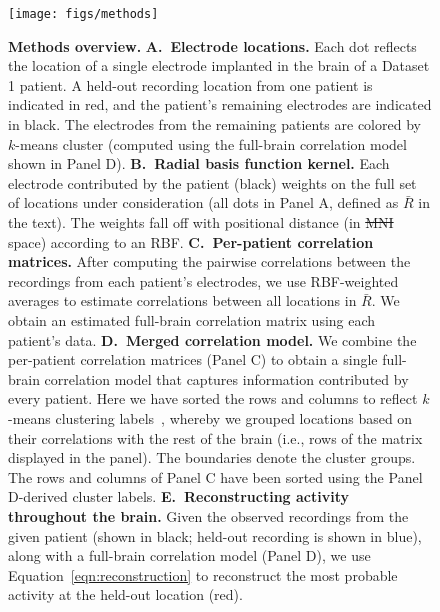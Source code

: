 \documentclass[10pt]{article}
\providecommand{\DIFaddtex}[1]{{\protect\color{blue}\uwave{#1}}} %
\providecommand{\DIFdeltex}[1]{{\protect\color{red}\sout{#1}}}                      %
\providecommand{\DIFaddFL}[1]{\DIFadd{#1}} %
\providecommand{\DIFdelFL}[1]{\DIFdel{#1}} %
\providecommand{\DIFaddbeginFL}{} %
\providecommand{\DIFaddendFL}{} %
\providecommand{\DIFdelbeginFL}{} %
\providecommand{\DIFdelendFL}{} %
\providecommand{\DIFadd}[1]{\texorpdfstring{\DIFaddtex{#1}}{#1}} %
\providecommand{\DIFdel}[1]{\texorpdfstring{\DIFdeltex{#1}}{}} %
\newcommand{\DIFscaledelfig}{0.5}
\newlength{\DIFdelgraphicswidth} %
\newlength{\DIFdelgraphicsheight} %
\newcommand{\DIFaddincludegraphics}[2][]{{\color{blue}\fbox{\DIFOincludegraphics[#1]{#2}}}} %
\newcommand{\DIFdelincludegraphics}[2][]{%
\sbox{\DIFdelgraphicsbox}{\DIFOincludegraphics[#1]{#2}}%
\settoboxwidth{\DIFdelgraphicswidth}{\DIFdelgraphicsbox} %
\settoboxtotalheight{\DIFdelgraphicsheight}{\DIFdelgraphicsbox} %
\scalebox{\DIFscaledelfig}{%
\parbox[b]{\DIFdelgraphicswidth}{\usebox{\DIFdelgraphicsbox}\\[-\baselineskip] \rule{\DIFdelgraphicswidth}{0em}}\llap{\resizebox{\DIFdelgraphicswidth}{\DIFdelgraphicsheight}{%
\setlength{\unitlength}{\DIFdelgraphicswidth}%
\begin{picture}(1,1)%
\thicklines\linethickness{2pt} %
{\color[rgb]{1,0,0}\put(0,0){\framebox(1,1){}}}%
{\color[rgb]{1,0,0}\put(0,0){\line( 1,1){1}}}%
{\color[rgb]{1,0,0}\put(0,1){\line(1,-1){1}}}%
\end{picture}%
}\hspace*{3pt}}} %
} %
\DeclareRobustCommand{\DIFaddbeginFL}{\DIFOaddbeginFL \let\includegraphics\DIFaddincludegraphics} %
\DeclareRobustCommand{\DIFaddendFL}{\DIFOaddendFL \let\includegraphics\DIFOincludegraphics} %
\DeclareRobustCommand{\DIFdelbeginFL}{\DIFOdelbeginFL \let\includegraphics\DIFdelincludegraphics} %
\DeclareRobustCommand{\DIFdelendFL}{\DIFOaddendFL \let\includegraphics\DIFOincludegraphics} %
\begin{document}
\begin{figure}
  \centering \texttt{[image: figs/methods]}
  \caption{\textbf{Methods overview.}  \textbf{A.~Electrode locations.}  Each
  dot reflects the location of a single electrode implanted in the brain of a
  Dataset 1 patient.  A held-out recording location from one patient is
  indicated in red, and the patient's remaining electrodes are indicated in
  black. The electrodes from the remaining patients are colored by $k$-means
  cluster (computed using the full-brain correlation model shown in Panel D).
  \textbf{B.~Radial basis function kernel.} Each electrode contributed by the
  patient (black) weights on the full set of locations under consideration (all
  dots in Panel A, defined as \DIFdelbeginFL \DIFdelFL{$\bar{R}$ }\DIFdelendFL \DIFaddbeginFL \DIFaddFL{$\overline{R}$ }\DIFaddendFL in the text).  The weights fall off with
  positional distance (in \DIFdelbeginFL \DIFdelFL{MNI }\DIFdelendFL \DIFaddbeginFL \DIFaddFL{MNI152 }\DIFaddendFL space) according to an RBF. \textbf{C.~Per-patient
  correlation matrices.}  After computing the pairwise correlations between the
  recordings from each patient's electrodes, we use RBF-weighted averages to
  estimate correlations between all locations in \DIFdelbeginFL \DIFdelFL{$\bar{R}$}\DIFdelendFL \DIFaddbeginFL \DIFaddFL{$\overline{R}$}\DIFaddendFL .  We obtain an
  estimated full-brain correlation matrix using each patient's data.
  \textbf{D.~Merged correlation model.}  We combine the per-patient correlation
  matrices (Panel C) to obtain a single full-brain correlation model that
  captures information contributed by every patient.  Here we have sorted the
  rows and columns to reflect $k$-means clustering labels~\citep[using
  $k$=7;][]{YeoEtal11}, whereby we grouped locations based on their correlations
  with the rest of the brain (i.e., rows of the matrix displayed in the panel).
  The boundaries denote the cluster groups.  The rows and columns of Panel C
  have been sorted using the Panel D-derived cluster labels.
  \textbf{E.~Reconstructing activity throughout the brain.}  Given the observed
  recordings from the given patient (shown in black; held-out recording is shown
  in blue), along with a full-brain correlation model (Panel D), we use
  Equation~\ref{eqn:reconstruction} to reconstruct the most probable activity at
  the held-out location (red).} \label{fig:methods}
\end{figure}
\end{document}
